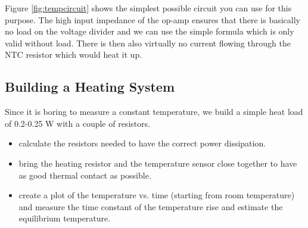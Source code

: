 Figure \ref{fig:tempcircuit} shows the simplest possible circuit you can use for this purpose. The high input impedance of the op-amp ensures that there is basically no load on the voltage divider and we can use the simple formula which is only valid without load. There is then also virtually no current flowing through the NTC resistor which would heat it up.



\subsection{Building a Heating System}\label{sec:heat}
Since it is boring to measure a constant temperature, we build a simple heat load of 0.2-0.25 W with a couple of resistors.
\begin{itemize}
	\item calculate the resistors needed to have the correct power dissipation.
	\item bring the heating resistor and the temperature sensor close together to have as good thermal contact as possible.
	\item create a plot of the temperature vs. time (starting from room temperature) and measure the time constant of the temperature rise and estimate the equilibrium temperature.
\end{itemize}

